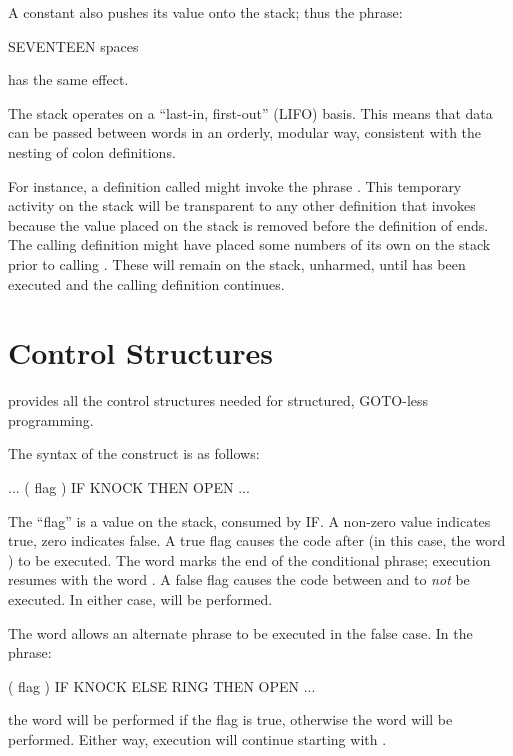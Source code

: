 A constant also pushes its value onto the stack; thus the phrase:
\begin{Code}
SEVENTEEN spaces
\end{Code}
has the same effect.

The stack operates on a ``last-in, first-out'' (LIFO) basis.  This means
that data can be passed between words in an orderly, modular way,
consistent with the nesting of colon definitions.

For instance, a definition called  might invoke the phrase
.  This temporary activity on the stack will be
transparent to any other definition that invokes  because the
value placed on the stack is removed before the definition of 
ends.  The calling definition might have placed some numbers of its own on
the stack prior to calling .  These will remain on the stack,
unharmed, until  has been executed and the calling definition
continues.

\section{Control Structures}
\Forth{} provides all the control structures%
needed for structured, GOTO-less programming.

The syntax of the  construct is as follows:
\begin{Code}
... ( flag ) IF  KNOCK  THEN  OPEN ...
\end{Code}
The ``flag'' is a value on the stack, consumed by IF. A
non-zero value indicates true, zero indicates false.  A true flag causes
the code after  (in this case, the word ) to be
executed.  The word  marks the end of the conditional phrase;
execution resumes with the word .  A false flag causes the
code between  and  to {\em not} be executed.  In
either case,  will be performed.

The word  allows an alternate phrase to be
executed in the false case. In the phrase:
\begin{Code}
( flag ) IF KNOCK  ELSE  RING  THEN  OPEN ...
\end{Code}
the word  will be performed if the flag is true, otherwise
the word  will be performed.  Either way, execution will
continue starting with .

